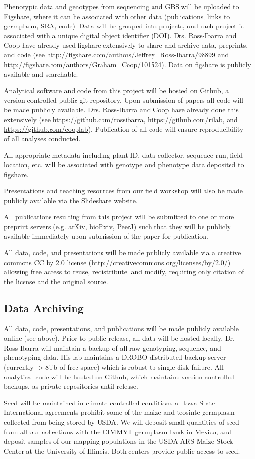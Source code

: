 Phenotypic data and genotypes from sequencing and GBS will be uploaded to Figshare, where it can be associated with other data (publications, links to germplasm, SRA, code). Data will be grouped into projects, and each project is associated with a unique digital object identifier (DOI). Drs. Ross-Ibarra and Coop have already used figshare extensively to share and archive data, preprints, and code (see \url{http://figshare.com/authors/Jeffrey_Ross-Ibarra/98899}  and \url{http://figshare.com/authors/Graham_Coop/101524}). Data on figshare is publicly available and searchable.

Analytical software and code from this project will be hosted on Github, a version-controlled public git repository.  Upon submission of papers all code will be made publicly available.  Drs. Ross-Ibarra and Coop have already done this extensively (see \url{https://github.com/rossibarra}, \url{https://github.com/rilab}, and \url{https://github.com/cooplab}). Publication of all code will ensure reproducibility of all analyses conducted.  

All appropriate metadata including plant ID, data collector, sequence run, field location, etc. will be associated with genotype and phenotype data deposited to figshare. 

Presentations and teaching resources from our field workshop will also be made publicly available via the Slideshare website.

All publications resulting from this project will be submitted to one or more preprint servers (e.g. arXiv, bioRxiv, PeerJ) such that they will be publicly available immediately upon submission of the paper for publication.

All data, code, and presentations will be made publicly available via a creative commons CC by 2.0 license (http://creativecommons.org/licenses/by/2.0/) allowing free access to reuse, redistribute, and modify, requiring only citation of the license and the original source.

\subsection*{Data Archiving}

All data, code, presentations, and publications will be made publicly available online (see above).  Prior to public release, all data will be hosted locally.  Dr. Ross-Ibarra will maintain a backup of all raw genotyping, sequence, and phenotyping data.  His lab maintains a DROBO distributed backup server (currently $>8$Tb of free space) which is robust to single disk failure. All analytical code will be hosted on Github, which maintains version-controlled backups, as private repositories until release. 

Seed will be maintained in climate-controlled conditions at Iowa State. International agreements prohibit some of the maize and teosinte germplasm collected from being stored by USDA.  We will deposit small quantities of seed from all our collections with the CIMMYT germplasm bank in Mexico, and deposit samples of our mapping populations in the USDA-ARS Maize Stock Center at the University of Illinois.  Both centers provide public access to seed.
